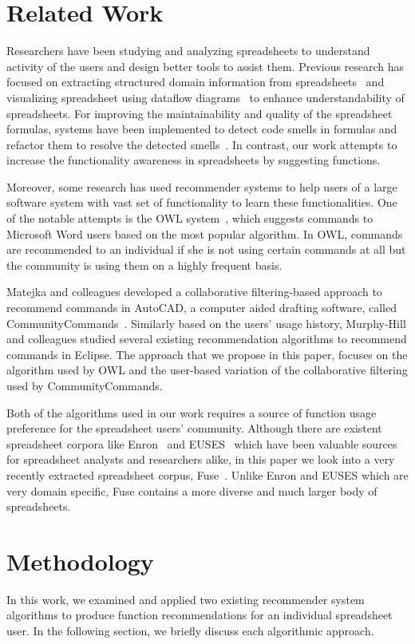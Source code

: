 \documentclass[conference]{IEEEtran}
\begin{document}
\section{Related Work}
Researchers have been studying and analyzing spreadsheets to understand activity of the users and design better tools to assist them. Previous research has focused on extracting structured domain information from spreadsheets~\cite{hermans2010automatically} and visualizing spreadsheet using dataflow diagrams~\cite{hermans2011breviz} to enhance understandability of spreadsheets. For improving the maintainability and quality of the spreadsheet formulas, systems have been implemented to detect code smells in formulas and refactor them to resolve the detected smells~\cite{hermans2014detecting}. In contrast, our work attempts to increase the functionality awareness in spreadsheets by suggesting functions.

Moreover, some research has used recommender systems to help users of a large software system with vast set of functionality to learn these functionalities. One of the notable attempts is the OWL system~\cite{linton2000owl}, which suggests commands to Microsoft Word users based on the most popular algorithm. In OWL, commands are recommended to an individual if she is not using certain commands at all but the community is using them on a highly frequent basis.

Matejka and colleagues developed a collaborative filtering-based approach to recommend commands in AutoCAD, a computer aided drafting software, called CommunityCommands~\cite{matejka2009communitycommands}. Similarly based on the users' usage history, Murphy-Hill and colleagues studied several existing recommendation algorithms to recommend commands in Eclipse. The approach that we propose in this paper,  focuses on the algorithm used by OWL and the user-based variation of the collaborative filtering used by CommunityCommands.

Both of the algorithms used in our work requires a source of function usage preference for the spreadsheet users' community. Although there are existent spreadsheet corpora like Enron~\cite{hermans2014enron} and EUSES~\cite{fisher2005euses} which have been valuable sources for spreadsheet analysts and researchers alike, in this paper we look into a very recently extracted spreadsheet corpus, Fuse~\cite{barik2015fuse}. Unlike Enron and EUSES which are very domain specific, Fuse contains a more diverse and much larger body of spreadsheets.

\section{Methodology}
In this work, we examined and applied two existing recommender system algorithms to produce function recommendations for an individual spreadsheet user. In the following section, we briefly discuss each algorithmic approach.
\end{document}
